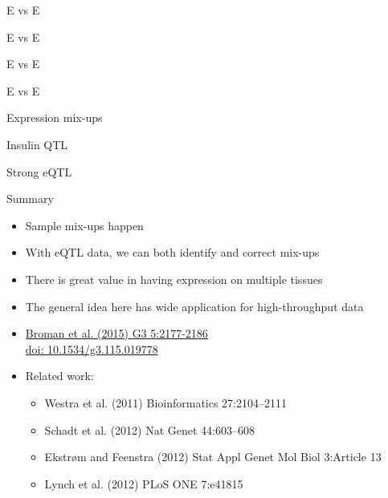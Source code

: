 \documentclass[12pt,t]{beamer}
\begin{document}
\begin{frame}[c]{E vs E}
\note{}
\end{frame}


\begin{frame}[c]{E vs E}
\note{}
\end{frame}


\begin{frame}[c]{E vs E}
\note{}
\end{frame}


\begin{frame}[c]{E vs E}
\note{}
\end{frame}

\begin{frame}[c]{Expression mix-ups}
\note{}
\end{frame}

\begin{frame}[c]{Insulin QTL}
\note{}
\end{frame}


\begin{frame}[c]{Strong eQTL}
\note{}
\end{frame}


\begin{frame}[c]{Summary}


\small
\begin{itemize}
\itemsep3pt

\item Sample mix-ups happen


\item With eQTL data, we can both identify and {\hilit correct} mix-ups

\item There is great value in having expression on multiple tissues

\item The general idea here has wide application for high-throughput data

\item \href{https://www.ncbi.nlm.nih.gov/pubmed/26290572}{Broman et
  al. (2015) G3 5:2177-2186} \\
\href{http://doi.org/10.1534/g3.115.019778}{doi: 10.1534/g3.115.019778}

\item Related work:

\begin{itemize}
\item Westra et al. (2011) Bioinformatics 27:2104--2111
\item Schadt et al. (2012) Nat Genet 44:603--608
\item Ekstr{\o}m and Feenstra (2012) Stat Appl Genet Mol Biol
  3:Article 13
\item Lynch et al. (2012) PLoS ONE 7:e41815
\end{itemize}

\end{itemize}
\note{}
\end{frame}
\end{document}
